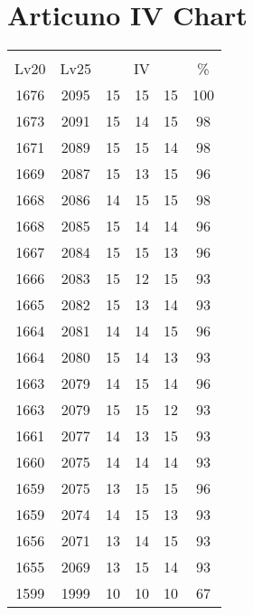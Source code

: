 \documentclass{article}%
\begin{document}
%
\normalsize%
\section{Articuno IV Chart}%
\label{sec:Articuno IV Chart}%
\renewcommand{\arraystretch}{1.5}%
\begin{tabular}{|c|c|c|c|c|c|}%
\hline%
\multicolumn{6}{|c|}{\textcolor{white}{ 
\linebreak{Articuno}
}%
\cellcolor{black}}\\%
\multicolumn{1}{|c}{Lv20}&\multicolumn{1}{c|}{Lv25}&\multicolumn{3}{c|}{IV}&\multicolumn{1}{|c|}{\%}\\%
\hline%
\rowcolor{color100}%
1676&2095&15&15&15&100\\%
\hline%
\rowcolor{color98}%
1673&2091&15&14&15&98\\%
\hline%
\rowcolor{color98}%
1671&2089&15&15&14&98\\%
\hline%
\rowcolor{color96}%
1669&2087&15&13&15&96\\%
\hline%
\rowcolor{color98}%
1668&2086&14&15&15&98\\%
\hline%
\rowcolor{color96}%
1668&2085&15&14&14&96\\%
\hline%
\rowcolor{color96}%
1667&2084&15&15&13&96\\%
\hline%
\rowcolor{color93}%
1666&2083&15&12&15&93\\%
\hline%
\rowcolor{color93}%
1665&2082&15&13&14&93\\%
\hline%
\rowcolor{color96}%
1664&2081&14&14&15&96\\%
\hline%
\rowcolor{color93}%
1664&2080&15&14&13&93\\%
\hline%
\rowcolor{color96}%
1663&2079&14&15&14&96\\%
\hline%
\rowcolor{color93}%
1663&2079&15&15&12&93\\%
\hline%
\rowcolor{color93}%
1661&2077&14&13&15&93\\%
\hline%
\rowcolor{color93}%
1660&2075&14&14&14&93\\%
\hline%
\rowcolor{color96}%
1659&2075&13&15&15&96\\%
\hline%
\rowcolor{color93}%
1659&2074&14&15&13&93\\%
\hline%
\rowcolor{color93}%
1656&2071&13&14&15&93\\%
\hline%
\rowcolor{color93}%
1655&2069&13&15&14&93\\%
\hline%
\rowcolor{color91}%
1599&1999&10&10&10&67\\%
\end{tabular}

%
\end{document}
